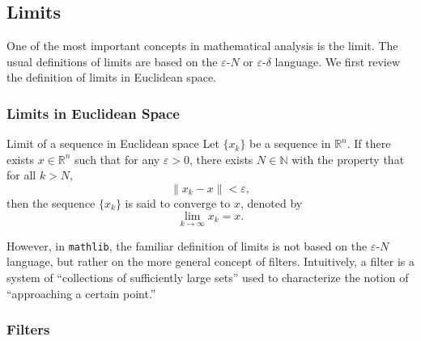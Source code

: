 \documentclass[a4paper]{article}
\begin{document}
\subsection{Limits}
\label{sec:limits}

One of the most important concepts in mathematical analysis is the limit. The usual definitions of limits are based on the \(\varepsilon\)-\(N\) or \(\varepsilon\)-\(\delta\) language. We first review the definition of limits in Euclidean space.

\subsubsection{Limits in Euclidean Space}

\begin{dfn}{Limit of a sequence in Euclidean space}
Let \(\{x_k\}\) be a sequence in \(\mathbb{R}^n\). If there exists \(x \in \mathbb{R}^n\) such that for any \(\varepsilon > 0\), there exists \(N \in \mathbb{N}\) with the property that for all \(k > N\),
\[
\| x_k - x \| < \varepsilon,
\]
then the sequence \(\{x_k\}\) is said to converge to \(x\), denoted by
\[
\lim_{k \to \infty} x_k = x.
\]
\end{dfn}

However, in \texttt{mathlib}, the familiar definition of limits is not based on the \(\varepsilon\)-\(N\) language, but rather on the more general concept of filters. Intuitively, a filter is a system of “collections of sufficiently large sets” used to characterize the notion of “approaching a certain point.”

\subsubsection{Filters}
\end{document}
